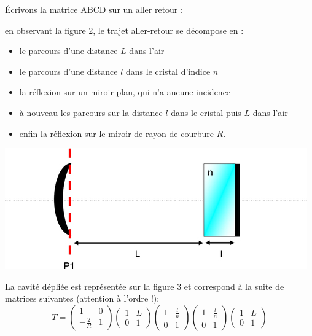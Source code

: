 \documentclass{book}
\begin{document}
Écrivons la matrice ABCD sur un aller retour :

en observant la figure 2, le trajet aller-retour se décompose en :

\begin{itemize}
    \item le parcours d'une distance \(L\) dans l'air
    \item le parcours d'une distance \(l\) dans le cristal d'indice \(n\)
    \item la réflexion sur un miroir plan, qui n'a aucune incidence
    \item à nouveau les parcours sur la distance \(l\) dans le cristal puis \(L\) dans l'air
    \item enfin la réflexion sur le miroir de rayon de courbure \(R\).
\end{itemize}

{\centering
\includegraphics[scale=1.7]{images/EC_Fig2.jpg}
\par}

La cavité dépliée est représentée sur la figure 3 et correspond à la suite de matrices suivantes (attention à l'ordre !):
\[T=\begin{pmatrix}
1 & 0 \\
-\frac 2R & 1
\end{pmatrix}\begin{pmatrix}
1 & L \\
0 & 1
\end{pmatrix}\begin{pmatrix}
1 & \frac ln \\
0 & 1
\end{pmatrix}\begin{pmatrix}
1 & \frac ln \\
0 & 1
\end{pmatrix}\begin{pmatrix}
1 & L \\
0 & 1
\end{pmatrix}\]
\end{document}
